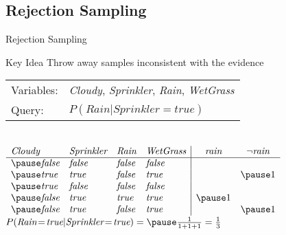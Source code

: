 \documentclass[14pt]{beamer}
\begin{document}
\subsection{Rejection Sampling}


\begin{frame}[fragile]{Rejection Sampling}
	\begin{block}{Key Idea}
		Throw away samples inconsistent with the evidence
	\end{block}
	\medskip
	\pause
	\begin{tabular}{ll}
		Variables: & \textit{Cloudy}, \textit{Sprinkler}, \textit{Rain}, \textit{WetGrass} \\
		Query:     & $P(\textit{Rain}|\textit{Sprinkler}\!=\!\textit{true})$
	\end{tabular}
	\\
	\medskip
	$
	\begin{array}{llll|cc}
		\textit{Cloudy} & \textit{Sprinkler} & \textit{Rain}  & \textit{WetGrass} & \textit{rain} & \lnot\textit{rain} \\
		\hline
		\pause
		\textit{false}  & \textit{false}     & \textit{false} & \textit{false}    &           &            \\
		\pause
		\textit{true}   & \textit{true}      & \textit{false} & \textit{true}     &           & \pause 1   \\
		\pause
		\textit{true}   & \textit{false}     & \textit{false} & \textit{false}    &           &            \\
		\pause
		\textit{false}  & \textit{true}      & \textit{true}  & \textit{true}     & \pause 1  &            \\
		\pause
		\textit{false}  & \textit{true}      & \textit{false} & \textit{true}     &           & \pause 1
	\end{array}
	$
	\\
	\medskip
	\pause
	\tab$P(\textit{Rain}\!=\!\textit{true}|\textit{Sprinkler}\!=\!\textit{true})=\pause\frac{1}{1 + 1 + 1}=\frac{1}{3}$
\end{frame}
\end{document}
